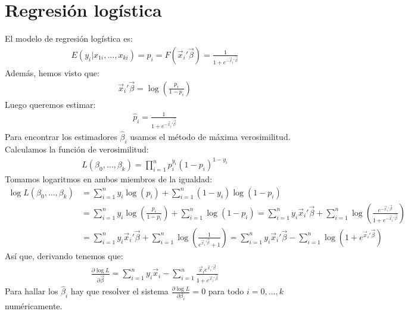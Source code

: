 \section{Regresión logística}
El modelo de regresión logística es:
\begin{align*}
    E(y_i | x_{1i}, \dots, x_{ki}) = p_i = F(\vec{x}_i'\vec{\beta}) = \frac{1}{1 + e^{-\vec{x}_i'\vec{\beta}}}
\end{align*}
Además, hemos visto que:
\begin{align*}
    \vec{x}_i'\vec{\beta} = \log\left(\frac{p_i}{1-p_i}\right)
\end{align*}
Luego queremos estimar:
\begin{align*}
    \widehat{p}_i = \frac{1}{1 + e^{-\vec{x}_i'\widehat{\vec{\beta}}}}
\end{align*}
Para encontrar los estimadores $\widehat{\beta}_i$ usamos el método de máxima verosimilitud.
Calculamos la función de verosimilitud:
\begin{align*}
    L(\beta_0, \dots, \beta_k) = \prod_{i=1}^n p_i^{y_i}(1-p_i)^{1-y_i}
\end{align*}
Tomamos logaritmos en ambos miembros de la igualdad:
\begin{align*}
    \log L(\beta_0, \dots, \beta_k) & = \sum_{i=1}^n y_i\log(p_i) + \sum_{i=1}^n (1-y_i)\log(1-p_i)                                                                                                                                                              \\
                                    & = \sum_{i=1}^n y_i\log\left(\frac{p_i}{1-p_i}\right) + \sum_{i=1}^n \log(1-p_i) = \sum_{i=1}^n y_i \vec{x}_i'\vec{\beta} + \sum_{i=1}^n \log\left(\frac{e^{-\vec{x}_i'\vec{\beta}}}{1 + e^{-\vec{x}_i'\vec{\beta}}}\right) \\
                                    & = \sum_{i=1}^n y_i \vec{x}_i'\vec{\beta} + \sum_{i=1}^n \log\left(\frac{1}{e^{\vec{x}_i'\vec{\beta}} + 1}\right) = \sum_{i=1}^n y_i \vec{x}_i'\vec{\beta} - \sum_{i=1}^n \log(1 + e^{\vec{x}_i'\vec{\beta}})
\end{align*}
Así que, derivando tenemos que:
\begin{align*}
    \frac{\partial \log L}{\partial \vec{\beta}} = \sum_{i=1}^n y_i\vec{x}_i - \sum_{i=1}^n \frac{\vec{x}_i e^{\vec{x}_i'\vec{\beta}}}{1 + e^{\vec{x}_i'\vec{\beta}}}
\end{align*}
Para hallar los $\widehat{\beta}_i$ hay que resolver el sistema $\frac{\partial \log L}{\partial \beta_i} = 0$ para todo $i = 0, \dots, k$ numéricamente.


